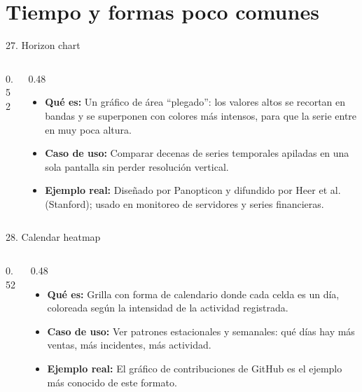 \documentclass[aspectratio=169,9pt]{beamer}
\newcommand{\ficha}[3]{%
\begin{itemize}
\item \textbf{Qué es:} #1
\item \textbf{Caso de uso:} #2
\item \textbf{Ejemplo real:} #3
\end{itemize}}
\begin{document}
\section{Tiempo y formas poco comunes}

\begin{frame}{27. Horizon chart}
\begin{columns}[T]
\begin{column}{0.52\textwidth}
\centering
{}
\end{column}
\begin{column}{0.48\textwidth}
\ficha{Un gráfico de área ``plegado'': los valores altos se recortan en bandas y se superponen con colores más intensos, para que la serie entre en muy poca altura.}
{Comparar decenas de series temporales apiladas en una sola pantalla sin perder resolución vertical.}
{Diseñado por Panopticon y difundido por Heer et al. (Stanford); usado en monitoreo de servidores y series financieras.}
\end{column}
\end{columns}
\end{frame}

\begin{frame}{28. Calendar heatmap}
\begin{columns}[T]
\begin{column}{0.52\textwidth}
\centering
{}
\end{column}
\begin{column}{0.48\textwidth}
\ficha{Grilla con forma de calendario donde cada celda es un día, coloreada según la intensidad de la actividad registrada.}
{Ver patrones estacionales y semanales: qué días hay más ventas, más incidentes, más actividad.}
{El gráfico de contribuciones de GitHub es el ejemplo más conocido de este formato.}
\end{column}
\end{columns}
\end{frame}
\end{document}

